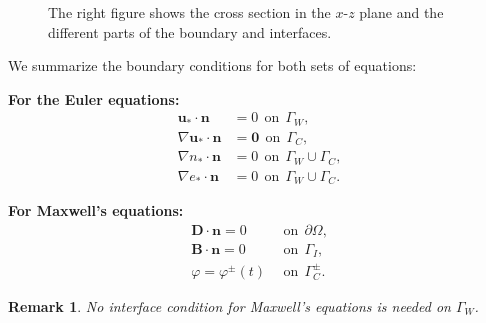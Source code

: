 \documentclass{article}
\newtheorem*{remark}{Remark}
\begin{document}
\begin{figure}
\begin{minipage}{0.49\textwidth}
{}
\end{minipage}
\caption{The right figure shows the cross section in the $x$-$z$ plane and the different
  parts of the boundary and interfaces.}
\label{fig:domain_sketch}
\end{figure}
We summarize the boundary conditions for both sets of equations:

\begin{minipage}[t]{0.49\textwidth}
    \textbf{For the Euler equations:}
    \begin{align*}
    \mathbf{u_*}\cdot \mathbf{n} &= 0 \ \ \text{on} \ \ \Gamma_W, \\
    \nabla \mathbf{u_*} \cdot \mathbf{n} &= \mathbf{0} \ \ \text{on} \ \ \Gamma_C, \\
    \nabla n_* \cdot \mathbf{n} &= 0 \ \ \text{on} \ \ \Gamma_W \cup \Gamma_C, \\
    \nabla e_* \cdot \mathbf{n} &= 0 \ \ \text{on} \ \ \Gamma_W \cup \Gamma_C.
\end{align*}
\end{minipage}
\begin{minipage}[t]{0.49\textwidth}
    \textbf{For Maxwell's equations:}
    \begin{align*}
    \mathbf{D} \cdot \mathbf{n} = 0\ \ &\text{on} \ \  \partial\Omega,  \\
    \mathbf{B} \cdot \mathbf{n} = 0\ \ &\text{on} \ \  \Gamma_I,  \\
    \varphi = \varphi^\pm(t)\ \ &\text{on} \ \ \Gamma_C^\pm.
    \end{align*}
\end{minipage}

\vspace{10pt}
\begin{remark}
    No interface condition for Maxwell's equations is needed on $\Gamma_W$.
\end{remark}
\end{document}
